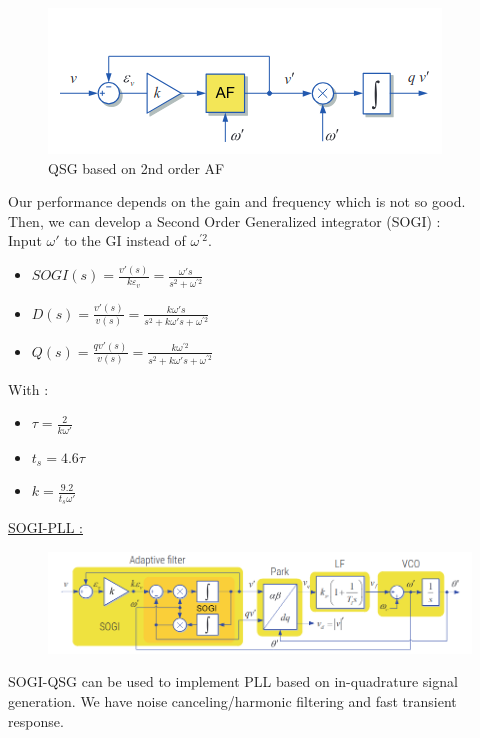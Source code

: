 \documentclass[../main.tex]{subfiles}
\begin{document}
\begin{figure}[hbt!]
    \centering
    \includegraphics[width=0.5\linewidth]{IMAGES/Indus_el/Screenshot from 2024-11-18 08-37-34.png}
    \caption{QSG based on 2nd order AF}
\end{figure}

\warning Our performance depends on the gain and frequency which is not so good.\\
Then, we can develop a Second Order Generalized integrator (SOGI) : \\

Input $\omega'$ to the GI instead of $\omega^{'2}$.\\

\begin{itemize}
    \item $SOGI(s) = \frac{v'(s)}{k \varepsilon_v} = \frac{\omega's}{s^2+\omega^{'2}}$
    \item $D(s) = \frac{v'(s)}{v(s)} = \frac{k \omega's}{s^2 + k \omega's + \omega^{'2}}$
    \item $Q(s) = \frac{qv'(s)}{v(s)} = \frac{k\omega^{'2}}{s^2 + k \omega's + \omega^{'2}}$
\end{itemize}
With : \begin{itemize}
    \item $\tau = \frac{2}{k\omega'}$
    \item $t_s = 4.6 \tau$
    \item $k = \frac{9.2}{t_s \omega'}$
\end{itemize}

\quad \underline{SOGI-PLL :}\\

\begin{figure}[hbt!]
    \centering
    \includegraphics[width=0.8\linewidth]{IMAGES/Indus_el/Screenshot from 2024-11-18 08-53-37.png}
\end{figure}

SOGI-QSG can be used to implement PLL based on in-quadrature signal generation. We have noise canceling/harmonic filtering and fast transient response.\\
\end{document}
